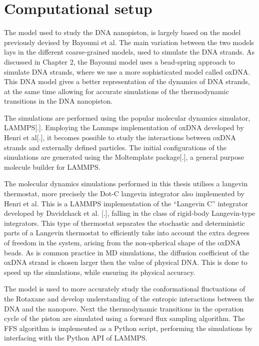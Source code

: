 \section{Computational setup}

The model used to study the DNA nanopiston, is largely based on the model
previously devised by Bayoumi et al. The main variation between the two models lays in
the different coarse-grained models, used to simulate the DNA strands. As discussed in
Chapter 2, the Bayoumi model uses a bead-spring approach to simulate DNA strands, where
we use a more sophisticated model called oxDNA. This DNA model gives a better
representation of the dynamics of DNA strands, at the same time allowing for accurate
simulations of the thermodynamic transitions in the DNA nanopiston.

The simulations are performed using the popular molecular dynamics simulator, LAMMPS[.].
Employing the Lammps implementation of oxDNA developed by Henri et al[.], it becomes
possible to study the interactions between oxDNA strands and externally defined
particles.
The initial configurations of the simulations are generated using the Moltemplate
package[.], a general purpose molecule builder for LAMMPS.

The molecular dynamics simulations performed in this thesis utilises a langevin
thermostat, more precisely the Dot-C langevin integrator also implemented by Henri et
al. This is a LAMMPS implementation of the “Langevin C” integrator developed by
Davidchack et al. [.], falling in the class of rigid-body Langevin-type integrators.
This type of thermostat separates the stochastic and deterministic parts of a Langevin
thermostat to efficiently take into account the extra degrees of freedom in the system,
arising from the non-spherical shape of the oxDNA beads. As is common practice in MD
simulations, the diffusion coefficient of the oxDNA strand is chosen larger then the
value of physical DNA. This is done to speed up the simulations, while ensuring its
physical accuracy.

The model is used to more accurately study the conformational fluctuations of
the Rotaxane and develop understanding of the entropic interactions between the DNA and
the nanopore. Next the thermodynamic transitions in the operation cycle of the piston are
simulated using a forward flux sampling algorithm. The FFS algorithm is implemented as a
Python script, performing the simulations by interfacing with the Python API of LAMMPS.
